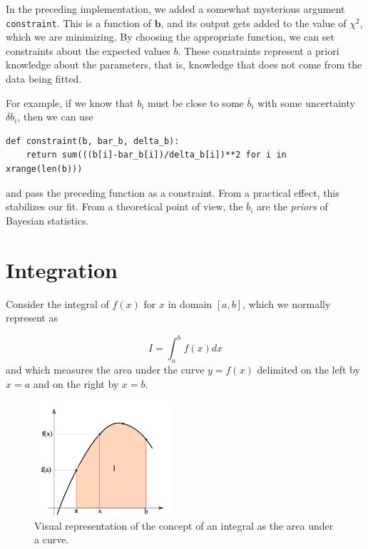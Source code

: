 \documentclass[justified,sixbynine]{tufte-book}
\def\ft{\small\tt}
\theoremstyle{plain}%
\theoremstyle{definition}
\theoremstyle{remark}
\begin{document}
\begin{fullwidth}

In the preceding implementation, we added a somewhat mysterious argument {\ft constraint}. This is a function of $\mathbf{b}$, and its output gets added to the value of $\chi^2$, which we are minimizing. By choosing the appropriate function, we can set constraints about the expected values $b$. These constraints represent a priori knowledge about the parameters, that is, knowledge that does not come from the data being fitted.

For example, if we know that $b_i$ must be close to some $\bar b_i$ with some uncertainty $\delta b_i$, then we can use
\begin{lstlisting}
def constraint(b, bar_b, delta_b):
    return sum(((b[i]-bar_b[i])/delta_b[i])**2 for i in xrange(len(b)))
\end{lstlisting}

and pass the preceding function as a constraint.
From a practical effect, this stabilizes our fit. From a theoretical point of view, the $\bar b_i$ are the {\it priors} of Bayesian statistics.

\goodbreak\section{Integration}


Consider the integral of $f(x)$ for $x$ in domain $[a,b]$, which we normally represent as

\begin{equation}
I = \int_a^b f(x)dx
\end{equation}
 and which measures the area under the curve $y=f(x)$ delimited on the left by $x=a$ and on the right by $x=b$.

\begin{figure}[ht]
\centering\includegraphics[width=2in]{images/integral1.png}
\caption{Visual representation of the concept of an integral as the area under a curve.}
\end{figure}


\end{fullwidth}
\end{document}
